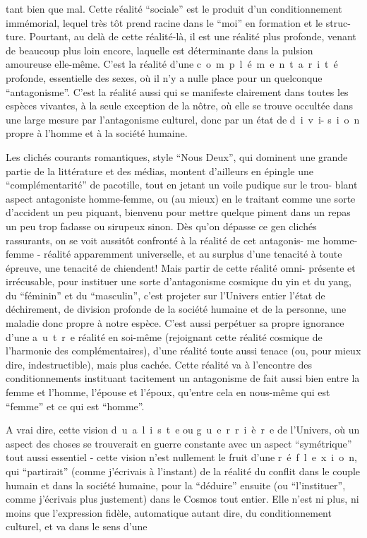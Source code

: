 tant bien que mal. Cette réalité ``sociale'' est le produit d'un conditionnement
immémorial, lequel très tôt prend racine dans le ``moi'' en formation et le struc-
ture. Pourtant, au delà de cette réalité-là, il est une réalité plus profonde,
venant de beaucoup plus loin encore, laquelle est déterminante dans la pulsion
amoureuse elle-même. C'est la réalité d'une \mbox{c o m p l é m e n t a r i t é}
profonde, essentielle des sexes, où il n'y a nulle place pour un quelconque
``antagonisme''. C'est la réalité aussi qui se manifeste clairement dans toutes les
espèces vivantes, à la seule exception de la nôtre, où elle se trouve occultée
dans une large mesure par l'antagonisme culturel, donc par un état de \mbox{d i v i-}
\mbox{s i o n} propre à l'homme et à la société humaine.

Les clichés courants romantiques, style ``Nous Deux'', qui dominent une
grande partie de la littérature et des médias, montent d'ailleurs en épingle
une ``complémentarité'' de pacotille, tout en jetant un voile pudique sur le trou-
blant aspect antagoniste homme-femme, ou (au mieux) en le traitant comme une
sorte d'accident un peu piquant, bienvenu pour mettre quelque piment dans un
repas un peu trop fadasse ou sirupeux sinon. Dès qu'on dépasse ce gen
clichés rassurants, on se voit aussitôt confronté à la réalité de cet antagonis-
me homme-femme - réalité apparemment universelle, et au surplus d'une tenacité à
toute épreuve, une tenacité de chiendent! Mais \quad partir de cette réalité omni-
présente et irrécusable, pour instituer une sorte d'antagonisme cosmique du
yin et du yang, du ``féminin'' et du ``masculin'', c'est projeter sur l'Univers
entier l'état de déchirement, de division profonde de la société humaine et de
la personne, une maladie donc propre à notre espèce. C'est aussi perpétuer sa
propre ignorance d'une \mbox{a u t r e} réalité en soi-même (rejoignant cette
réalité cosmique de l'harmonie des complémentaires), d'une réalité toute aussi
tenace (ou, pour mieux dire, indestructible), mais plus cachée. Cette réalité
va à l'encontre des conditionnements instituant tacitement un antagonisme de
fait aussi bien entre la femme et l'homme, l'épouse et l'époux, qu'entre cela
en nous-même qui est ``femme'' et ce qui est ``homme''.

A vrai dire, cette vision \mbox{d u a l i s t e} ou \mbox{g u e r r i è r e} de
l'Univers, où un aspect des choses se trouverait en guerre constante avec un
aspect ``symétrique'' tout aussi essentiel - cette vision n'est nullement le
fruit d'une \mbox{r é f l e x i o n}, qui ``partirait'' (comme j'écrivais à l'instant)
de la réalité du conflit dans le couple humain et dans la société humaine, pour
la ``déduire'' ensuite (ou ``l'instituer'', comme j'écrivais plus justement) dans
le Cosmos tout entier. Elle n'est ni plus, ni moins que l'expression fidèle,
automatique autant dire, du conditionnement culturel, et va dans le sens d'une
\margin{-}

